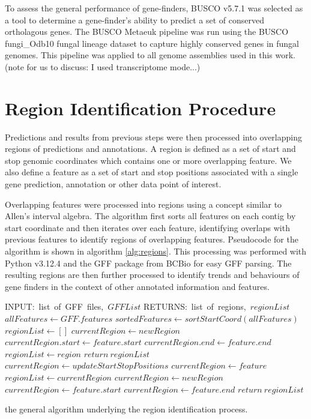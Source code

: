 To assess the general performance of gene-finders, BUSCO
v5.7.1\cite{10.1093/bioinformatics/btv351} was selected as a tool to
determine a gene-finder's ability to predict a set of conserved
ortholagous genes. The BUSCO Metaeuk pipeline was run using the BUSCO
fungi\_Odb10 fungal lineage dataset to capture highly conserved genes
in fungal genomes. This pipeline was applied to all genome assemblies
used in this work. (note for us to discuss: I used transcriptome
mode...)

\section{Region Identification Procedure}
\label{section:region-met}

Predictions and results from previous steps were then processed into
overlapping regions of predictions and annotations. A region is
defined as a set of start and stop genomic coordinates which contains
one or more overlapping feature. We also define a feature as a set of
start and stop positions associated with a single gene prediction,
annotation or other data point of interest.

Overlapping features were processed into regions using a concept
similar to Allen's interval algebra\cite{DECHTER2003333}. The
algorithm first sorts all features on each contig by start coordinate
and then iterates over each feature, identifying overlaps with
previous features to identify regions of overlapping
features. Pseudocode for the algorithm is shown in algorithm
\ref{alg:regions}. This processing was performed with Python
v3.12.4\cite{Foundation} and the GFF package from BCBio\cite{Chapman}
for easy GFF parsing.  The resulting regions are then further
processed to identify trends and behaviours of gene finders in the
context of other annotated information and features.

\begin{algorithm}
  \begin{algorithmic}
    \State INPUT:\ list\ of\ GFF\ files,\ $GFFList$
    \State RETURNS:\ list\ of\ regions,\ $regionList$
    \State $allFeatures \gets GFF.features$
    \EndFor
    \State $sortedFeatures \gets sortStartCoord(allFeatures)$
    \State $regionList \gets []$
        \State $currentRegion \gets newRegion$
        \State $currentRegion.start \gets feature.start$
        \State $currentRegion.end \gets feature.end$
        \State $regionList \gets region$
        \State $return\ regionList$
        \State $currentRegion \gets updateStartStopPositions$
        \State $currentRegion \gets feature$
      \Else
        \State $regionList \gets currentRegion$
        \State $currentRegion \gets newRegion$
        \State $currentRegion \gets feature.start$
        \State $currentRegion \gets feature.end$
      \EndIf
    \EndFor
    \State $return\ regionList$
  \end{algorithmic}
  \caption{the general algorithm underlying the region identification
    process.}
  \label{alg:regions}
\end{algorithm}

